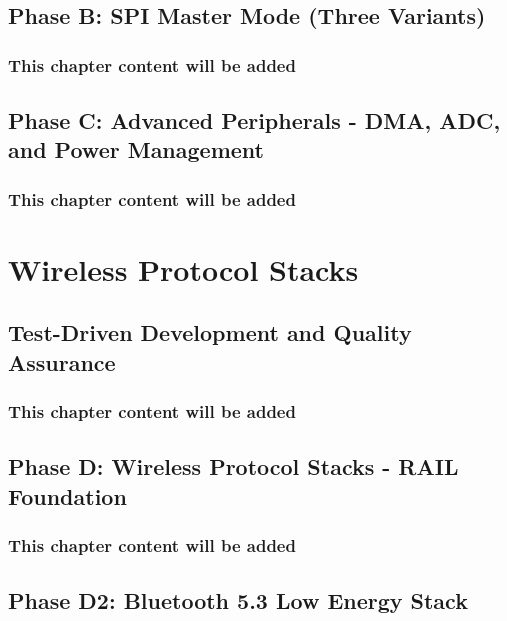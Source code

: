 \documentclass[11pt,a4paper,twoside,openright]{book}
\begin{document}
\chapter{Phase B: SPI Master Mode (Three Variants)}
\label{ch:chapter-08}
\section*{This chapter content will be added}
\clearpage

\chapter{Phase C: Advanced Peripherals - DMA, ADC, and Power Management}
\label{ch:chapter-09}
\section*{This chapter content will be added}
\clearpage

\part{Wireless Protocol Stacks}
\label{part:wireless}

\chapter{Test-Driven Development and Quality Assurance}
\label{ch:chapter-10}
\section*{This chapter content will be added}
\clearpage

\chapter{Phase D: Wireless Protocol Stacks - RAIL Foundation}
\label{ch:chapter-11}
\section*{This chapter content will be added}
\clearpage

\chapter{Phase D2: Bluetooth 5.3 Low Energy Stack}
\label{ch:chapter-12}
\end{document}
